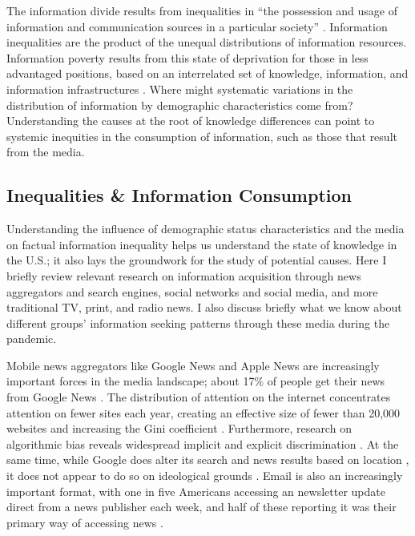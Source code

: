 \documentclass[11pt]{article}
\begin{document}
The information divide results from inequalities in ``the possession and usage of information and communication sources in a particular society'' \citep[231]{Yu2006}. Information inequalities are the product of the unequal distributions of information resources. Information poverty results from this state of deprivation for those in less advantaged positions, based on an interrelated set of knowledge, information, and information infrastructures \citep{Britz2004}. Where might systematic variations in the distribution of information by demographic characteristics come from? Understanding the causes at the root of knowledge differences can point to systemic inequities in the consumption of information, such as those that result from the media.


\subsection{Inequalities \& Information Consumption}

Understanding the influence of demographic status characteristics and the media on factual information inequality helps us understand the state of knowledge in the U.S.; it also lays the groundwork for the study of potential causes. Here I briefly review relevant research on information acquisition through news aggregators and search engines, social networks and social media, and more traditional TV, print, and radio news. I also discuss briefly what we know about different groups' information seeking patterns through these media during the pandemic. 

Mobile news aggregators like Google News and Apple News are increasingly important forces in the media landscape; about 17\% of people get their news from Google News \citep{Reuters2020}. The distribution of attention on the internet concentrates attention on fewer sites each year, creating an effective size of fewer than 20,000 websites and increasing the Gini coefficient \citep{McCurley2007}. Furthermore, research on algorithmic bias reveals widespread implicit and explicit discrimination \citep{Sweeney2013,ONeil2016,Eubanks2018,Noble2018}. At the same time, while Google does alter its search and news results based on location \citep{KlimanSilver2015,Fischer2020}, it does not appear to do so on ideological grounds \citep{Haim2018}. Email is also an increasingly important format, with one in five Americans accessing an newsletter update direct from a news publisher each week, and half of these reporting it was their primary way of accessing news \citep{Reuters2020}. 
\end{document}

